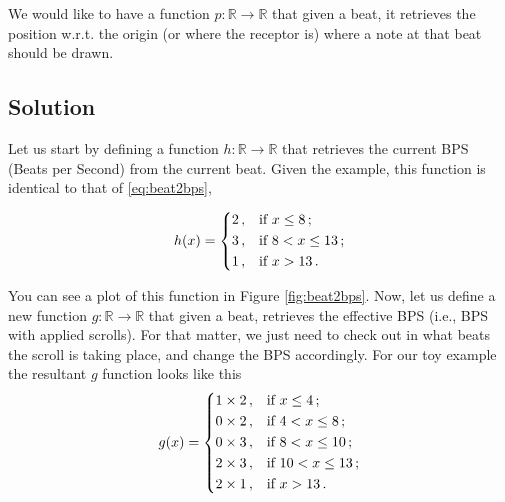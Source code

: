 \documentclass[a4paper,9pt]{article}
\begin{document}
    We would like to have a function $ p: \mathbb{R} \rightarrow \mathbb{R} $ that given a beat, it retrieves the position w.r.t. the origin (or where the receptor is) where a note at that beat should be drawn.

    \subsection{Solution}
    Let us start by defining a function $h: \mathbb{R} \rightarrow \mathbb{R}$ that retrieves the current BPS (Beats per Second) from the current beat. Given the example, this function is identical to that of \eqref{eq:beat2bps},

    \begin{equation}
	    h(x) = \begin{dcases}
		    2\,, & \text{if $x \leq 8\,;$}\\ 
		    3\,, & \text{if $8 < x \leq 13\,;$}\\ 
		    1\,, & \text{if $x > 13\,.$}\\ 
	    \end{dcases}
	    \label{eq:beat2bps-as-h}
    \end{equation}

    You can see a plot of this function in Figure  \ref{fig:beat2bps}. Now, let us define a new function $g: \mathbb{R}\rightarrow \mathbb{R}$ that given a beat, retrieves the effective BPS (i.e., BPS with applied scrolls). For that matter, we just need to check out in what beats the scroll is taking place, and change the BPS accordingly. For our toy example the resultant $g$ function looks like this
    \begin{equation}
	    g(x) = \begin{dcases}
		    1\times 2\,, & \text{if $x \leq 4\,;$}\\ 
		    0\times 2\,, & \text{if $4 < x \leq 8\,;$}\\ 
		    0\times 3\,, & \text{if $8 < x \leq 10\,;$}\\ 
		    2\times 3\,, & \text{if $10 < x \leq 13\,;$}\\ 
		    2\times 1 \,, & \text{if $x > 13\,.$}\\ 
	    \end{dcases}
	    \label{eq:beat2effective-bps}
    \end{equation}
\end{document}
